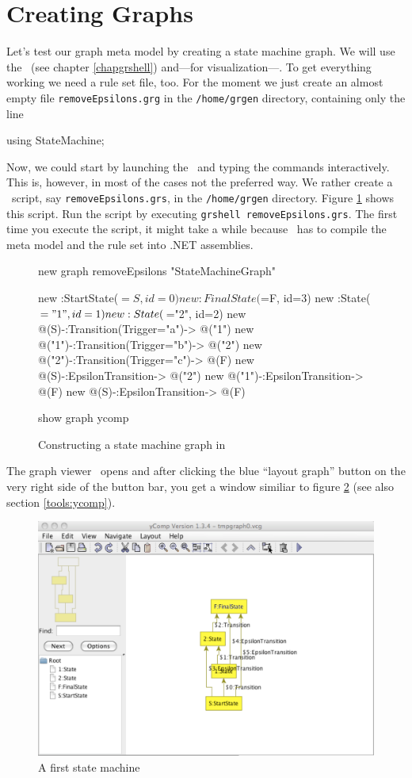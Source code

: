 \section{Creating Graphs}
\label{sct:quick:create}
Let's test our graph meta model by creating a state machine graph.
We will use the \GrShell\ (see chapter \ref{chapgrshell}) and---for visualization---\yComp.
To get everything working we need a rule set file, too.
For the moment we just create an almost empty file \texttt{removeEpsilons.grg} in the \texttt{/home/grgen} directory, containing only the line
\begin{grgen}
using StateMachine;
\end{grgen}
Now, we could start by launching the \GrShell\ and typing the commands interactively.
This is, however, in most of the cases not the preferred way.
We rather create a \GrShell\ script, say \texttt{removeEpsilons.grs}, in the \texttt{/home/grgen} directory.
Figure \ref{fig:quick:shell} shows this script.
Run the script by executing \texttt{grshell removeEpsilons.grs}.
The first time you execute the script, it might take a while because \GrG\ has to compile the meta model and the rule set into .NET assemblies.
\begin{figure}[htbp]
    \centering
    \begin{grgen}
new graph removeEpsilons "StateMachineGraph"

new :StartState($=S, id=0)
new :FinalState($=F, id=3)
new :State($="1", id=1)
new :State($="2", id=2)
new @(S)-:Transition(Trigger="a")-> @("1")
new @("1")-:Transition(Trigger="b")-> @("2")
new @("2")-:Transition(Trigger="c")-> @(F)
new @(S)-:EpsilonTransition-> @("2")
new @("1")-:EpsilonTransition-> @(F)
new @(S)-:EpsilonTransition-> @(F)

show graph ycomp
    \end{grgen}
    \caption{Constructing a state machine graph in \GrShell}
    \label{fig:quick:shell}
\end{figure}
The graph viewer \yComp\ opens and after clicking the blue ``layout graph'' button on the very right side of the button bar, you get a window similiar to figure \ref{fig:quick:ycomp} (see also section \ref{tools:ycomp}).
\begin{figure}[htbp]
	\centering
	\includegraphics[width=0.8\linewidth]{fig/quickycomp}
	\caption{A first state machine}
	\label{fig:quick:ycomp}
\end{figure}
